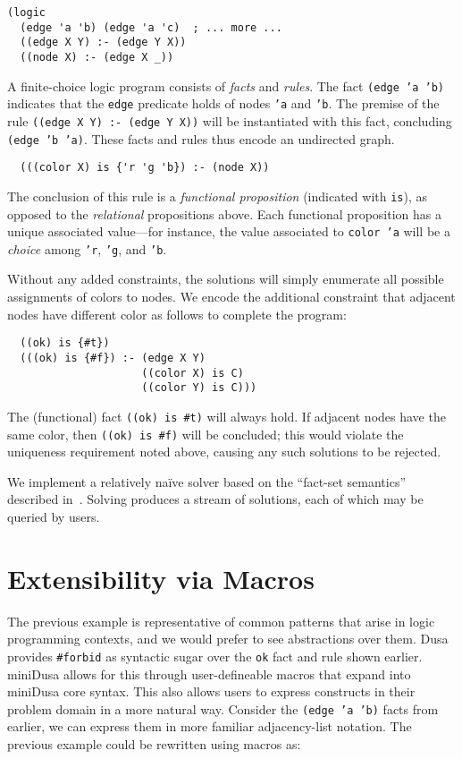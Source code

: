 \documentclass[dvipsnames,sigplan,screen,review,anonymous,acmthm,nonacm]{acmart}
\begin{document}
\begin{verbatim}
(logic
  (edge 'a 'b) (edge 'a 'c)  ; ... more ...
  ((edge X Y) :- (edge Y X))
  ((node X) :- (edge X _))
\end{verbatim}
A finite-choice logic program consists of \emph{facts} and \emph{rules}.
The fact \texttt{(edge 'a 'b)} indicates that the \texttt{edge} predicate
holds of nodes \texttt{'a} and \texttt{'b}.
The premise of the rule \texttt{((edge X Y) :- (edge Y X))} will be
instantiated with this fact, concluding \texttt{(edge 'b 'a)}.
These facts and rules thus encode an undirected graph.

\begin{verbatim}
  (((color X) is {'r 'g 'b}) :- (node X))
\end{verbatim}
The conclusion of this rule is a \emph{functional proposition}
(indicated with \texttt{is}), as opposed to the \emph{relational} propositions above.
Each functional proposition has a unique associated value---for instance,
the value associated to \texttt{color 'a} will be a
\emph{choice} among \texttt{'r}, \texttt{'g}, and \texttt{'b}.

Without any added constraints, the solutions will simply enumerate all
possible assignments of colors to nodes. We encode the additional constraint
that adjacent nodes have different color as follows to complete the program:

\begin{verbatim}
  ((ok) is {#t})
  (((ok) is {#f}) :- (edge X Y)
                     ((color X) is C)
                     ((color Y) is C)))
\end{verbatim}
The (functional) fact \texttt{((ok) is {\#t})} will always hold.
If adjacent nodes have the same color, then \texttt{((ok) is {\#f})}
will be concluded; this would violate the uniqueness requirement noted
above, causing any such solutions to be rejected.

We implement a relatively naïve solver based on the ``fact-set semantics''
described in~\cite{martens2025dusa}. Solving produces a stream of solutions,
each of which may be queried by users.

\section{Extensibility via Macros}

The previous example is representative of common patterns that arise in logic
programming contexts, and we would prefer to see abstractions over them. Dusa
provides \texttt{\#forbid} as syntactic sugar over the \texttt{ok} fact and rule
shown earlier. miniDusa allows for this through user-defineable macros that
expand into miniDusa core syntax. This also allows users to express constructs
in their problem domain in a more natural way. Consider the
\texttt{(edge 'a 'b)} facts from earlier, we can express them in more familiar
adjacency-list notation.
The previous example could be rewritten using macros as:
\end{document}
